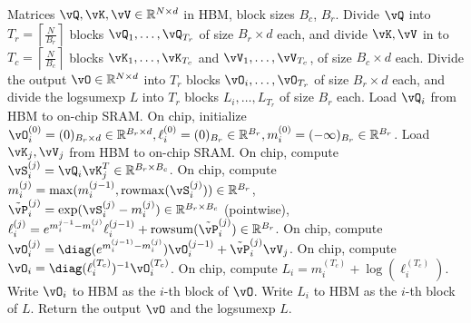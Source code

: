 \begin{algorithm}[H]
  \caption{\small\label{alg:flash2_fwd}\sysname forward pass}
  \begin{algorithmic}[1]
    \REQUIRE Matrices $\vQ, \vK, \vV \in \mathbb{R}^{N \times d}$ in HBM, block sizes $B_c$, $B_r$.
    \STATE \label{alg:stream_attn_split_qkv} Divide $\vQ$ into $T_r = \left\lceil\frac{N}{B_r} \right\rceil$ blocks $\vQ_1, \dots, \vQ_{T_r}$ of size $B_r \times d$ each,
    and divide $\vK, \vV$ in to $T_c = \left\lceil \frac{N}{B_c} \right\rceil$ blocks $\vK_1, \dots, \vK_{T_c}$ and
    $\vV_1, \dots, \vV_{T_c}$, of size $B_c \times d$ each.
    \STATE Divide the output $\vO \in \mathbb{R}^{N \times d}$ into $T_r$ blocks $\vO_i, \dots, \vO_{T_r}$ of size
    $B_r \times d$ each, and divide the logsumexp $L$ into $T_r$ blocks $L_i, \dots, L_{T_r}$ of size
    $B_r$ each.
     \label{alg:stream_attn_outer_loop}
      \STATE \label{alg:stream_attn_load_q} Load $\vQ_i$ from HBM to on-chip SRAM.
      \STATE \label{alg:stream_attn_init} On chip, initialize $\vO_{i}^{(0)} = (0)_{B_r \times d} \in \mathbb{R}^{B_r \times d}, \ell_{i}^{(0)} = (0)_{B_r} \in \mathbb{R}^{B_r}, m_{i}^{(0)} = (-\infty)_{B_r} \in \mathbb{R}^{B_r}$.
        \STATE \label{alg:stream_attn_load_kv} Load $\vK_j, \vV_j$ from HBM to on-chip SRAM.
        \STATE \label{alg:stream_attn_qk} On chip, compute $\vS_{i}^{(j)} = \vQ_i \vK_j^T \in \mathbb{R}^{B_r \times B_c}$.
        \STATE \label{alg:stream_attn_statistics} On chip, compute
        $m_{i}^{(j)} = \mathrm{max}(m_{i}^{(j-1)}, \mathrm{rowmax}(\vS_{i}^{(j)})) \in \mathbb{R}^{B_r}$, $\tilde{\vP}_{i}^{(j)} = \exp(\vS_{i}^{(j)} - m_{i}^{(j)}) \in \mathbb{R}^{B_r \times B_c}$ (pointwise),
        $\ell_{i}^{(j)} = e^{m_{i}^{j-1} - m_{i}^{(j)}} \ell_{i}^{(j-1)} + \mathrm{row sum}(\tilde{\vP}_{i}^{(j)}) \in \mathbb{R}^{B_r}$.
        \STATE \label{alg:stream_attn_update} On chip, compute
        $\vO_{i}^{(j)} = \diag(e^{m_{i}^{(j-1)} - m_{i}^{(j)}}) \vO_{i}^{(j-1)} + \tilde{\vP}_{i}^{(j)} \vV_j$.
      \ENDFOR
      \STATE On chip, compute $\vO_{i} = \diag(\ell_{i}^{(T_c)})^{-1} \vO_{i}^{(T_c)}$.
      \STATE On chip, compute $L_{i} = m_{i}^{(T_c)} + \log(\ell_i^{(T_c)})$.
      \STATE Write $\vO_{i}$ to HBM as the $i$-th block of $\vO$.
      \STATE Write $L_{i}$ to HBM as the $i$-th block of $L$.
    \ENDFOR
    \STATE Return the output $\vO$ and the logsumexp $L$.
  \end{algorithmic}
\end{algorithm}




